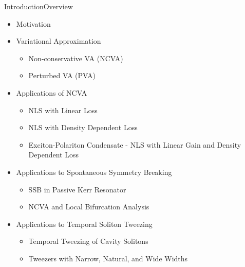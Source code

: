  \begin{frame}[c]{Introduction}{Overview}
\begin{itemize}
\item \textcolor{paleblue}{Motivation}
\item \textcolor{paleblue}{Variational Approximation} 
	\begin{itemize}
	\item Non-conservative VA (NCVA)
	\item Perturbed VA (PVA)
	\end{itemize}
\item \textcolor{paleblue}{Applications of NCVA}
	\begin{itemize}
	\item NLS with Linear Loss
	\item NLS with Density Dependent Loss
	\item Exciton-Polariton Condensate - NLS with Linear Gain and Density Dependent Loss
	\end{itemize}
\item \textcolor{paleblue}{Applications to Spontaneous Symmetry Breaking} 
	\begin{itemize}
		\item SSB in Passive Kerr Resonator	
		\item NCVA and Local Bifurcation Analysis
	\end{itemize}
\item \textcolor{paleblue}{Applications to Temporal Soliton Tweezing} 
	\begin{itemize}
		\item Temporal Tweezing of Cavity Solitons
		\item Tweezers with Narrow, Natural, and Wide Widths
	\end{itemize}
\end{itemize}
\end{frame}
%

